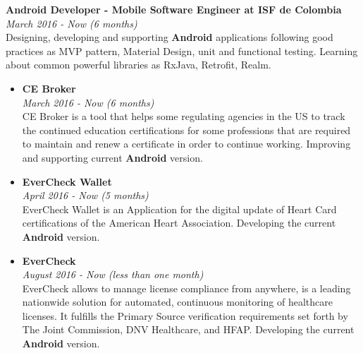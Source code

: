 \documentclass[margin, 10pt]{res} %
\begin{document}
\begin{resume}
\textbf{Android Developer - Mobile Software Engineer at ISF de Colombia} \\
\textit{March 2016 - Now (6 months)} \\
Designing, developing and supporting \textbf{Android} applications following good practices as MVP
pattern, Material Design, unit and functional testing. Learning about common powerful libraries as
RxJava, Retrofit, Realm.
\begin{itemize}
  \item \textbf{CE Broker} \\
        \textit{March 2016 - Now (6 months)} \\
        CE Broker is a tool that helps some regulating agencies in the US to track the continued
        education certifications for some professions that are required to maintain and renew a
        certificate in order to continue working. Improving and supporting current \textbf{Android}
        version.\\

  \item \textbf{EverCheck Wallet} \\
        \textit{April 2016 - Now (5 months)} \\
        EverCheck Wallet is an Application for the digital update of Heart Card certifications of
        the American Heart Association. Developing the current \textbf{Android} version.\\

  \item \textbf{EverCheck} \\
        \textit{August 2016 - Now (less than one month)} \\
        EverCheck allows to manage license compliance from anywhere, is a leading nationwide
        solution for automated, continuous monitoring of healthcare licenses. It fulfills the
        Primary Source verification requirements set forth by The Joint Commission, DNV Healthcare,
        and HFAP. Developing the current \textbf{Android} version.\\
\end{itemize}


\end{resume}
\end{document}
